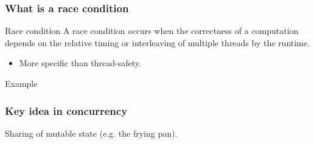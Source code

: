 \documentclass[xcolor={dvipsnames,svgnames},aspectratio=169]{beamer}
\begin{document}
\begin{frame}[fragile]
  \frametitle{What is a race condition}

  \begin{block}{Race condition}
    A race condition occurs when the correctness of a computation depends
    on the relative timing or interleaving of multiple threads by the runtime.
  \end{block}

  \begin{itemize}
  \item[\faBook] More specific than thread-safety.
  \end{itemize}

    \begin{block}{Example}
  \end{block}
\end{frame}

\begin{frame}[fragile]
  \frametitle{Key idea in concurrency}

  Sharing of mutable state (e.g. the frying pan).
\end{frame}

\end{document}
